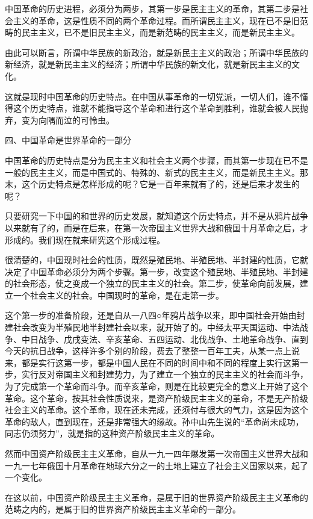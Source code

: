 \documentclass[UTF8, 12pt, a4paper]{ctexrep}
\begin{document}
中国革命的历史进程，必须分为两步，其第一步是民主主义的革命，其第二步是社会主义的革命，这是性质不同的两个革命过程。而所谓民主主义，现在已不是旧范畴的民主主义，已不是旧民主主义，而是新范畴的民主主义，而是新民主主义。

由此可以断言，所谓中华民族的新政治，就是新民主主义的政治；所谓中华民族的新经济，就是新民主主义的经济；所谓中华民族的新文化，就是新民主主义的文化。

这就是现时中国革命的历史特点。在中国从事革命的一切党派，一切人们，谁不懂得这个历史特点，谁就不能指导这个革命和进行这个革命到胜利，谁就会被人民抛弃，变为向隅而泣的可怜虫。

四、中国革命是世界革命的一部分

中国革命的历史特点是分为民主主义和社会主义两个步骤，而其第一步现在已不是一般的民主主义，而是中国式的、特殊的、新式的民主主义，而是新民主主义。那末，这个历史特点是怎样形成的呢？它是一百年来就有了的，还是后来才发生的呢？

只要研究一下中国的和世界的历史发展，就知道这个历史特点，并不是从鸦片战争以来就有了的，而是在后来，在第一次帝国主义世界大战和俄国十月革命之后，才形成的。我们现在就来研究这个形成过程。

很清楚的，中国现时社会的性质，既然是殖民地、半殖民地、半封建的性质，它就决定了中国革命必须分为两个步骤。第一步，改变这个殖民地、半殖民地、半封建的社会形态，使之变成一个独立的民主主义的社会。第二步，使革命向前发展，建立一个社会主义的社会。中国现时的革命，是在走第一步。

这个第一步的准备阶段，还是自从一八四○年鸦片战争以来，即中国社会开始由封建社会改变为半殖民地半封建社会以来，就开始了的。中经太平天国运动、中法战争、中日战争、戊戌变法、辛亥革命、五四运动、北伐战争、土地革命战争、直到今天的抗日战争，这样许多个别的阶段，费去了整整一百年工夫，从某一点上说来，都是实行这第一步，都是中国人民在不同的时间中和不同的程度上实行这第一步，实行反对帝国主义和封建势力，为了建立一个独立的民主主义的社会而斗争，为了完成第一个革命而斗争。而辛亥革命，则是在比较更完全的意义上开始了这个革命。这个革命，按其社会性质说来，是资产阶级民主主义的革命，不是无产阶级社会主义的革命。这个革命，现在还未完成，还须付与很大的气力，这是因为这个革命的敌人，直到现在，还是非常强大的缘故。孙中山先生说的“革命尚未成功，同志仍须努力”，就是指的这种资产阶级民主主义的革命。

然而中国资产阶级民主主义革命，自从一九一四年爆发第一次帝国主义世界大战和一九一七年俄国十月革命在地球六分之一的土地上建立了社会主义国家以来，起了一个变化。

在这以前，中国资产阶级民主主义革命，是属于旧的世界资产阶级民主主义革命的范畴之内的，是属于旧的世界资产阶级民主主义革命的一部分。
\end{document}
